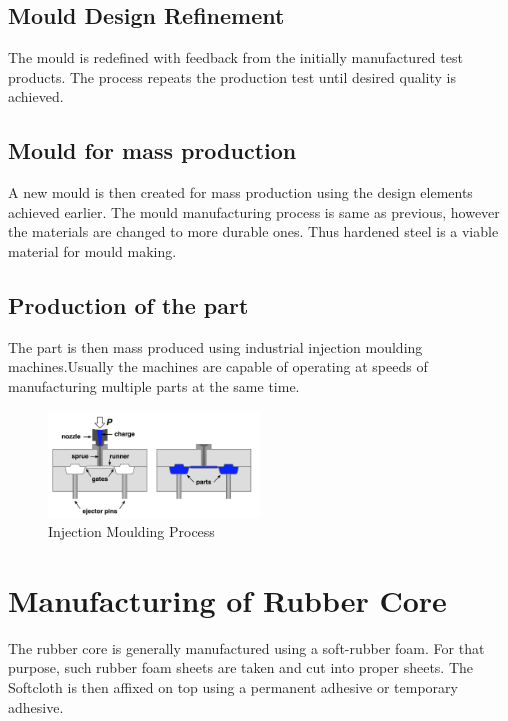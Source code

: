 \documentclass[12pt,a4paper,oneside]{article}
\begin{document}
\subsection{Mould Design Refinement}

The mould is redefined with feedback from the initially manufactured test products. The process repeats the production test until desired quality is achieved.

\subsection{Mould for mass production}

A new mould is then created for mass production using the design elements achieved earlier. The mould manufacturing process is same as previous, however the materials are changed to more durable ones. Thus hardened steel is a viable material for mould making. 
\cite{2018:Injection}


\subsection{Production of the part}

The part is then mass produced using industrial injection moulding machines.Usually the machines are capable of operating at speeds of manufacturing multiple parts at the same time.  

\begin{figure}[H]
\includegraphics[width=0.5\textwidth]{injection-moulding}
\caption{Injection Moulding Process\cite{2018:InjectionImage}}
\end{figure}


\newpage

\section{Manufacturing of Rubber Core}

The rubber core is generally manufactured using a soft-rubber foam. For that purpose, such rubber foam sheets are taken and cut into proper sheets. The Softcloth is then affixed on top using a permanent adhesive or temporary adhesive. 
\end{document}
